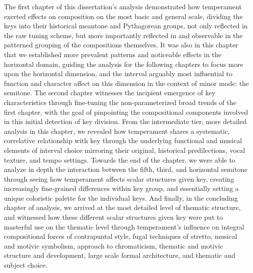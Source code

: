 The first chapter of this dissertation's analysis demonstrated how
temperament exerted effects on composition on the most basic and general
scale, dividing the keys into their historical meantone and Pythagorean
groups, not only reflected in the raw tuning scheme, but more
importantly reflected in and observable in the patterned grouping of the
compositions themselves. It was also in this chapter that we established
more prevalent patterns and noticeable effects in the horizontal domain,
guiding the analysis for the following chapters to focus more upon the
horizontal dimension, and the interval arguably most influential to
function and character affect on this dimension in the context of minor
mode: the semitone. The second chapter witnesses the incipient emergence
of key characteristics through fine-tuning the non-parameterized broad
trends of the first chapter, with the goal of pinpointing the
compositional components involved in this initial detection of key
division. From the intermediate tier, more detailed analysis in this
chapter, we revealed how temperament shares a systematic, correlative
relationship with key through the underlying functional and musical
elements of interval choice mirroring their original, historical
predilections, vocal texture, and tempo settings. Towards the end of the
chapter, we were able to analyze in depth the interaction between the
fifth, third, and horizontal semitone through seeing how temperament
affects scalar structures given key, creating increasingly fine-grained
differences within key group, and essentially setting a unique
coloristic palette for the individual keys. And finally, in the
concluding chapter of analysis, we arrived at the most detailed level of
thematic structure, and witnessed how these different scalar structures
given key were put to masterful use on the thematic level through
temperament's influence on integral compositional forces of contrapuntal
style, fugal techniques of stretto, musical and motivic symbolism,
approach to chromaticism, thematic and motivic structure and
development, large scale formal architecture, and thematic and subject
choice.

